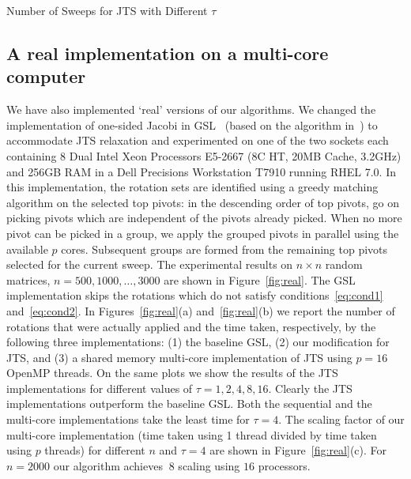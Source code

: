 \documentclass[10pt, conference, compsocconf]{IEEEtran}
\begin{document}

\begin{table}
  \centering
  \caption{Number of Sweeps for JTS with Different $\tau$}
  \label{tab:varyk}
  
\end{table}

\subsection{A real implementation on a multi-core computer}

We have also implemented `real' versions of our algorithms. We changed the implementation of one-sided Jacobi in GSL~\cite{galassi1996gnu} (based on the algorithm in~\cite{nash1975one}) to accommodate JTS relaxation and experimented on one of the two sockets each containing 8 Dual Intel Xeon Processors E5-2667 (8C HT, 20MB Cache, 3.2GHz) and 256GB RAM in a Dell Precisions Workstation T7910 running RHEL 7.0. In this implementation, the rotation sets are identified using a greedy matching algorithm on the selected top pivots: in the descending order of top pivots, go on picking pivots which are independent of the pivots already picked. When no more pivot can be picked in a group, we apply the grouped pivots in parallel using the available $p$ cores. Subsequent groups are formed from the remaining top pivots selected for the current sweep. The experimental results on $n \times n$ random matrices, $n=500, 1000, \ldots, 3000$ are shown in Figure~\ref{fig:real}. The GSL implementation skips the rotations which do not satisfy conditions~\eqref{eq:cond1} and~\eqref{eq:cond2}. In Figures~\ref{fig:real}(a) and~\ref{fig:real}(b) we report the number of rotations that were actually applied and the time taken, respectively, by the following three implementations: (1) the baseline GSL, (2) our modification for JTS, and (3) a shared memory multi-core implementation of JTS using $p{=}16$ OpenMP threads. On the same plots we show the results of the JTS implementations for different values of $\tau {=} 1, 2, 4, 8, 16$. Clearly the JTS implementations outperform the baseline GSL. Both the sequential and the multi-core implementations take the least time for $\tau {=} 4$. The scaling factor of our multi-core implementation (time taken using 1 thread divided by time taken using $p$ threads) for different $n$ and $\tau=4$ are shown in Figure~\ref{fig:real}(c). For $n{=}2000$ our algorithm achieves $~8$ scaling using $16$ processors.
\end{document}
